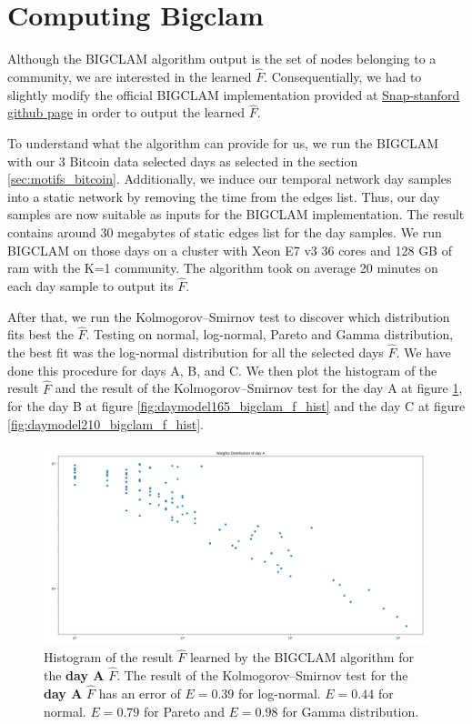 \documentclass[../../thesis.tex]{subfiles}
\begin{document}
\section{Computing Bigclam}
\label{sec:applying_bigclam}

Although the BIGCLAM algorithm output is the set of nodes belonging to a community, we are interested in the learned $\hat{F}$. Consequentially, we had to slightly modify the official BIGCLAM implementation provided at \href{https://github.com/snap-stanford/snap/tree/master/examples/bigclam}{Snap-stanford github page} in order to output the learned $\hat{F}$. 

To understand what the algorithm can provide for us, we run the BIGCLAM with our 3 Bitcoin data selected days as selected in the section \ref{sec:motifs_bitcoin}. Additionally, we induce our temporal network day samples into a static network by removing the time from the edges list. Thus, our day samples are now suitable as inputs for the BIGCLAM implementation. The result contains around 30 megabytes of static edges list for the day samples. We run BIGCLAM on those days on a cluster with Xeon E7 v3 36 cores and 128 GB of ram with the K=1 community. The algorithm took on average 20 minutes on each day sample to output its $\hat{F}$. 

After that, we run the Kolmogorov–Smirnov test \cite{massey1951kolmogorov} to discover which distribution fits best the $\hat{F}$. Testing on normal, log-normal, Pareto and Gamma distribution, the best fit was the log-normal distribution for all the selected days $\hat{F}$. We have done this procedure for days A, B, and C. We then plot the histogram of the result $\hat{F}$ and the result of the Kolmogorov–Smirnov test for the day A at figure \ref{fig:daymodel122_bigclam_f_hist}, for the day B at figure \ref{fig:daymodel165_bigclam_f_hist} and the day C at figure \ref{fig:daymodel210_bigclam_f_hist}. 

\begin{figure}[H]
\centering
\includegraphics[width=\textwidth]{content/learning/img/daymodel122_bigclam_f_hist}
\caption{Histogram of the result $\hat{F}$ learned by the BIGCLAM algorithm for the \textbf{day A} $\hat{F}$. The result of the Kolmogorov–Smirnov test for the \textbf{day A} $\hat{F}$ has an error of $E=0.39$ for log-normal. $E=0.44$ for normal. $E=0.79$ for Pareto and $E=0.98$ for Gamma distribution. }
\label{fig:daymodel122_bigclam_f_hist}
\end{figure}
\end{document}
